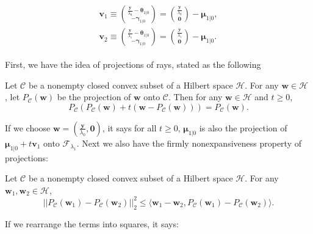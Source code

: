 \begin{gather}
    \label{eq:1.2.1}
    \begin{aligned}
        \boldsymbol v_1\equiv\binom{\frac{\boldsymbol y}{\lambda_0}-\boldsymbol \theta_{1|0}}{-\boldsymbol \gamma_{1|0}}=\binom{\frac{\boldsymbol y}{\lambda_0}}{\boldsymbol0}-\boldsymbol\mu_{1|0},\\
        \boldsymbol v_2\equiv \binom{\frac{\boldsymbol y}{\lambda_1}-\boldsymbol \theta_{1|0}}{-\boldsymbol \gamma_{1|0}}=\binom{\frac{\boldsymbol y}{\lambda_1}}{\boldsymbol0}-\boldsymbol\mu_{1|0}.
    \end{aligned}
\end{gather}

First, we have the idea of projections of rays, stated as the following

\begin{lemma}
    \citep{Bauschke2011}
    Let $\mathcal{C}$ be a nonempty closed convex subset of a Hilbert space $\mathcal{H}$. For any $\boldsymbol w\in\mathcal{H}$ , let $P_{\mathcal{C}}(\boldsymbol w)$ be the projection of $\boldsymbol w$ onto $\mathcal{C}$. Then for any $\boldsymbol w\in\mathcal{H}$ and $t\geq 0$,
    \begin{equation}
        P_{\mathcal{C}}\left(P_{\mathcal{C}}(\boldsymbol w)+t\left(\boldsymbol w-P_{\mathcal{C}}(\boldsymbol w)\right)\right)=P_{\mathcal{C}}(\boldsymbol w).
    \end{equation}
\end{lemma}

If we choose $\boldsymbol w=(\frac{\boldsymbol y}{\lambda_0},\boldsymbol0)$, it says for all $t\geq 0$, $\boldsymbol\mu_{1|0}$ is also the projection of $\boldsymbol\mu_{1|0}+t\boldsymbol v_1$ onto $\mathcal{F}_{\lambda_1}$. Next we also have the firmly nonexpansiveness property of projections:

\begin{lemma}
    \citep{Bauschke2011}
    Let $\mathcal{C}$ be a nonempty closed convex subset of a Hilbert space $\mathcal{H}$. For any $\boldsymbol w_1,\boldsymbol w_2\in\mathcal{H}$,
    \begin{equation}
        ||P_{\mathcal{C}}(\boldsymbol w_1)-P_{\mathcal{C}}(\boldsymbol w_2)||_2^2\leq \langle\boldsymbol w_1-\boldsymbol w_2, P_{\mathcal{C}}(\boldsymbol w_1)-P_{\mathcal{C}}(\boldsymbol w_2)\rangle.
    \end{equation}
\end{lemma}

If we rearrange the terms into squares, it says:

